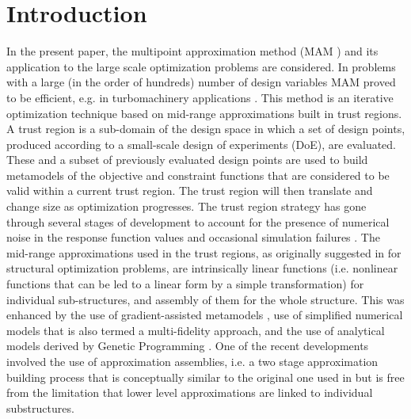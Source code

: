 \documentclass[runningheads,a4paper]{llncs}
\begin{document}
\section{Introduction}

\Russian
In the present paper, the multipoint approximation method (MAM \cite{Toropov1989,Toropov1992,ToropovFilatov1993}) and its application to the large scale optimization problems are considered. In problems with a large (in the order of hundreds) number of design variables MAM proved to be efficient, e.g. in turbomachinery applications \cite{ShahparPolynkinToropov2008,PolynkinToropovShahpar2008,PolynkinToropovShahpar2010}. This method is an iterative optimization technique based on mid-range approximations built in trust regions. A trust region is a sub-domain of the design space in which a set of design points, produced according to a small-scale design of experiments (DoE), are evaluated. These and a subset of previously evaluated design points are used to build metamodels of the objective and constraint functions that are considered to be valid within a current trust region. The trust region will then translate and change size as optimization progresses. The trust region strategy has gone through several stages of development to account for the presence of numerical noise in the response function values \cite{KeulenToropovMarkine1996,ToropovKeulenMarkine1996} and occasional simulation failures \cite{ToropovMarkineHolden1999}. The mid-range approximations used in the trust regions, as originally suggested in \cite{Toropov1989} for structural optimization problems, are intrinsically linear functions (i.e. nonlinear functions that can be led to a linear form by a simple transformation) for individual sub-structures, and assembly of them for the whole structure. This was enhanced by the use of gradient-assisted metamodels \cite{ToropovFilatov1993}, use of simplified numerical models that is also termed a multi-fidelity approach,\cite{ToropovMarkine1996} and the use of analytical models derived by Genetic Programming \cite{ToropovAlvarez1998}. One of the recent developments \cite{PolynkinToropov2012} involved the use of approximation assemblies, i.e. a two stage approximation building process that is conceptually similar to the original one used in \cite{Toropov1989} but is free from the limitation that lower level approximations are linked to individual substructures.
\end{document}
